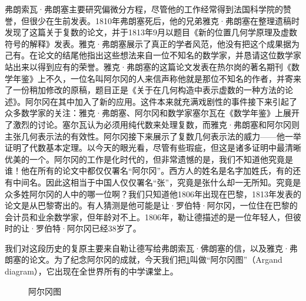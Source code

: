\documentclass[b5paper]{ctexart}
\begin{document}
弗朗索瓦·弗朗塞主要研究偏微分方程，尽管他的工作经常得到法国科学院的赞誉，但很少在生前发表。1810年弗朗塞死后，他的兄弟雅克·弗朗塞在整理遗稿时发现了这篇关于复数的论文，并于1813年9月以题目《新的位置几何学原理及虚数符号的解释》发表。雅克·弗朗塞展示了真正的学者风范，他没有把这个成果据为己有。在论文的结尾他指出这些想法来自一位不知名的数学家，并恳请这位数学家站出来以得到应有的荣誉。雅克·弗朗塞的这篇论文发表在热尔岗的著名期刊《数学年鉴》上不久，一位名叫阿尔冈的人来信声称他就是那位不知名的作者，并寄来了一份稍加修改的原稿，题目正是《关于在几何构造中表示虚数的一种方法的论述》。阿尔冈在其中加入了新的应用。这件本来就充满戏剧性的事件接下来引起了众多数学家的关注：雅克·弗朗塞、阿尔冈和数学家塞尔瓦在《数学年鉴》上展开了激烈的讨论。塞尔瓦认为必须用纯代数来处理复数，而雅克·弗朗塞和阿尔冈则主张几何表示法的有效性。阿尔冈接下来展示了复数几何表示法的威力——他一举证明了代数基本定理。以今天的眼光看，尽管有些瑕疵，但这是诸多证明中最清晰优美的一个。阿尔冈的工作是化时代的，但非常遗憾的是，我们不知道他究竟是谁！他在所有的论文中都仅仅署名“阿尔冈”。西方人的姓名是名字加姓氏，有的还有中间名。因此这相当于中国人仅仅署名“张”，究竟是张什么却一无所知。究竟是众多姓阿尔冈的人中的哪一位啊？我们只知道他1806年出现在巴黎，1813年发表的论文是从巴黎寄出的。有人猜测是他可能是让·罗伯特·阿尔冈，一位住在巴黎的会计员和业余数学家，但年龄对不上。1806年，勒让德描述的是一位年轻人，但彼时的让·罗伯特·阿尔冈已经38岁了\cite{MacTour-Argand}。

我们对这段历史的复原主要来自勒让德写给弗朗索瓦·佛朗塞的信，以及雅克·弗朗塞的论文。为了纪念阿尔冈的成就，今天我们把\cref{fig:Argand-diagram}叫做“阿尔冈图”（Argand diagram），它出现在全世界所有的中学课堂上\cite{Weisstein-2025}。

\begin{figure}[htbp]
  \centering
  \caption{阿尔冈图}
 \label{fig:Argand-diagram}
\end{figure}
\end{document}
